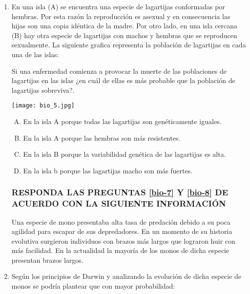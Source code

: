 \begin{enumerate}
\item En una isla (A) se encuentra una especie de lagartijas conformadas por hembras. Por esta razón la reproducción es asexual y en consecuencia las hijas son una copia idéntica de la madre.  Por otro lado, en una isla cercana (B) hay otra especie de lagartijas con machos y hembras que se reproducen sexualmente.  La siguiente grafica representa la población de lagartijas en cada una de las islas:\label{bio-6}

Si una enfermedad comienza a provocar la muerte de las poblaciones de lagartijas en las islas ¿en cuál de ellas es más  probable que la población de lagartijas sobreviva?.

\begin{flushleft}
\texttt{[image: bio\_5.jpg]} 
\end{flushleft}

\begin{enumerate}[(A)]
\item En la isla A porque todas las lagartijas son genéticamente iguales.
\item En la isla A porque las hembras son más resistentes.
\item En la isla B porque la variabilidad genética de las lagartijas es alta. 
\item En la isla b porque las lagartijas macho son m\'as fuertes.
\end{enumerate}

\subsubsection*{RESPONDA LAS PREGUNTAS \ref{bio-7} Y \ref{bio-8} DE ACUERDO CON LA SIGUIENTE INFORMACIÓN }
Una especie de mono presentaba alta tasa de predación debido a su poca agilidad para escapar de sus depredadores. En un momento de su historia evolutiva surgieron individuos con brazos más largos que lograron huir con más facilidad. En la actualidad la mayoría de los monos de dicha especie presentan brazos largos.


\item  Según los principios de Darwin y analizando la evolución de dicha especie de monos se podría plantear que con mayor probabilidad: \label{bio-7}


\end{enumerate}
